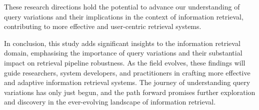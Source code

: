 These research directions hold the potential to advance our understanding of query variations and their implications in the context of information retrieval, contributing to more effective and user-centric retrieval systems.

In conclusion, this study adds significant insights to the information retrieval domain, emphasising the importance of query variations and their substantial impact on retrieval pipeline robustness. As the field evolves, these findings will guide researchers, system developers, and practitioners in crafting more effective and adaptive information retrieval systems. The journey of understanding query variations has only just begun, and the path forward promises further exploration and discovery in the ever-evolving landscape of information retrieval.